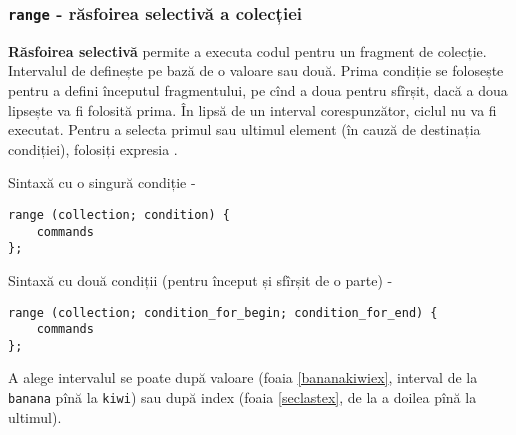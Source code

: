 \begin{sourcecode}
\label{filterdataex}
\inputminted[linenos]{icl}{../sources/filterdataex.icL}
\end{sourcecode}

\begin{sourcecode}
\label{filterindexex}
\inputminted[linenos]{icl}{../sources/filterindexex.icL}
\end{sourcecode}

\subsubsection{\texttt{range} - răsfoirea selectivă a colecției}

{\bf Răsfoirea selectivă} permite a executa codul pentru un fragment de colecție. Intervalul de definește pe bază de o valoare sau două. Prima condiție se folosește pentru a defini începutul fragmentului, pe cînd a doua pentru sfîrșit, dacă a doua lipsește va fi folosită prima. În lipsă de un interval corespunzător, ciclul nu va fi executat. Pentru a selecta primul sau ultimul element (în cauză de destinația condiției), folosiți expresia \true{}.

Sintaxă cu o singură condiție -
\begin{verbatim}
range (collection; condition) {
	commands
};
\end{verbatim}

Sintaxă cu două condiții (pentru început și sfîrșit de o parte) -
\begin{verbatim}
range (collection; condition_for_begin; condition_for_end) {
	commands
};
\end{verbatim}

A alege intervalul se poate după valoare (foaia \ref{bananakiwiex}, interval de la \texttt{banana} pînă la \texttt{kiwi}) sau după index (foaia \ref{seclastex}, de la a doilea pînă la ultimul).

\begin{sourcecode}
\label{bananakiwiex}
\inputminted[linenos]{icl}{../sources/bananakiwiex.icL}
\end{sourcecode}

\begin{sourcecode}
\vspace{-2em}
\label{seclastex}
\inputminted[linenos]{icl}{../sources/seclastex.icL}
\end{sourcecode}